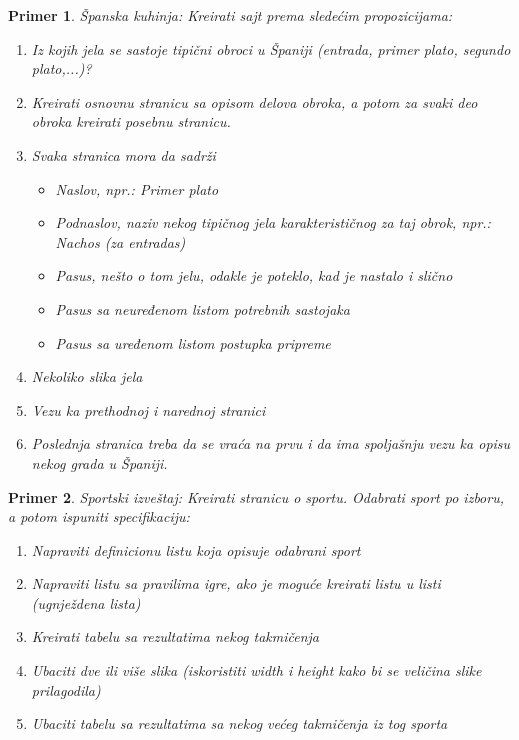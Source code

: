 \documentclass[a4paper]{article}
\newtheorem{primer}{Primer}[section]
\begin{document}
\begin{primer}
Španska kuhinja: Kreirati sajt prema sledećim propozicijama:
\begin{enumerate}
\item Iz kojih jela se sastoje tipični obroci u Španiji (entrada, primer plato, segundo plato,...)?
\item Kreirati osnovnu stranicu sa opisom delova obroka, a potom za svaki deo obroka kreirati posebnu stranicu.
\item Svaka stranica mora da sadrži
	\begin{itemize}
		\item Naslov, npr.: Primer plato
		\item Podnaslov, naziv nekog tipičnog jela karakterističnog za taj obrok, npr.: Nachos (za entradas)
		\item Pasus, nešto o tom jelu, odakle je poteklo, kad je nastalo  i slično
		\item Pasus sa neuređenom listom potrebnih sastojaka
		\item Pasus sa uređenom listom postupka pripreme
	\end{itemize}
\item Nekoliko slika jela
\item Vezu ka prethodnoj i narednoj stranici
\item Poslednja stranica treba da se vraća na prvu i da ima spoljašnju vezu ka opisu nekog grada u Španiji.
\end{enumerate}
\end{primer}
\begin{primer}
Sportski izveštaj: Kreirati stranicu o sportu. Odabrati sport po izboru, a potom ispuniti specifikaciju:
\begin{enumerate}
\item Napraviti definicionu listu koja opisuje odabrani sport
\item Napraviti listu sa pravilima igre, ako je moguće kreirati listu u listi (ugnježdena lista)
\item Kreirati tabelu sa rezultatima nekog takmičenja
\item Ubaciti dve ili više slika (iskoristiti width i height kako bi se veličina slike prilagodila)
\item Ubaciti tabelu sa rezultatima sa nekog većeg takmičenja iz tog sporta
\end{enumerate}
\end{primer}
\end{document}
